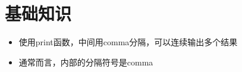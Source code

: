 
\section{基础知识}

\begin{itemize}
  \item 使用print函数，中间用comma分隔，可以连续输出多个结果
  \item 通常而言，内部的分隔符号是comma
\end{itemize}
